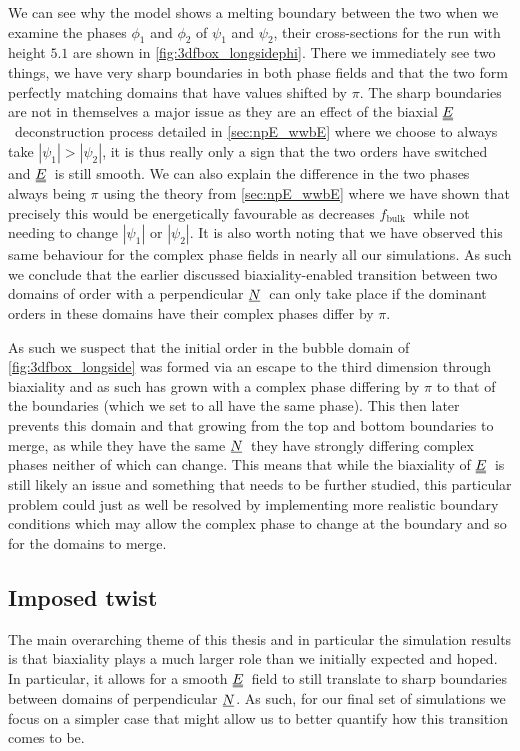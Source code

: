 \documentclass[12pt]{article}
\newcommand{\suf}[2]{\stackunder[0.5pt]{\stackunder[1pt]{\ensuremath{#1}}{\rule{\widthof{\ensuremath{#2}}*\real{0.9}}{.1ex}}}{}}
\newcommand{\duf}[2]{\stackunder[0.5pt]{\stackunder[0.8pt]{\stackunder[1pt]{\ensuremath{#1}}{\rule{\widthof{\ensuremath{#2}}*\real{0.9}}{.1ex}}}{\rule{\widthof{\ensuremath{#2}}*\real{0.9}}{.1ex}}}{}}
\newcommand{\su}[1]{\suf{#1}{#1}}
\newcommand{\du}[1]{\duf{#1}{#1}}
\newcommand{\NN}{\ensuremath{\su{N}}}
\newcommand{\EE}{\ensuremath{\du{E}}}
\newcommand{\FB}{\ensuremath{f_\text{bulk}}}
\begin{document}
        We can see why the model shows a melting boundary between the two when we examine the phases $\phi_1$ and $\phi_2$ of $\psi_1$ and $\psi_2$, their cross-sections for the run with height $5.1\si{}$ are shown in \cref{fig:3dfbox_longsidephi}.
        There we immediately see two things, we have very sharp boundaries in both phase fields and that the two form perfectly matching domains that have values shifted by $\pi$.
        The sharp boundaries are not in themselves a major issue as they are an effect of the biaxial \EE\ deconstruction process detailed in \cref{sec:npE_wwbE} where we choose to always take $|\psi_1| > |\psi_2|$, it is thus really only a sign that the two orders have switched and \EE\ is still smooth.
        We can also explain the difference in the two phases always being $\pi$ using the theory from \cref{sec:npE_wwbE} where we have shown that precisely this would be energetically favourable as decreases \FB\ while not needing to change $|\psi_1|$ or $|\psi_2|$.
        It is also worth noting that we have observed this same behaviour for the complex phase fields in nearly all our simulations.
        As such we conclude that the earlier discussed biaxiality-enabled transition between two domains of order with a perpendicular \NN\ can only take place if the dominant orders in these domains have their complex phases differ by $\pi$.

        As such we suspect that the initial order in the bubble domain of \cref{fig:3dfbox_longside} was formed via an escape to the third dimension through biaxiality and as such has grown with a complex phase differing by $\pi$ to that of the boundaries (which we set to all have the same phase).
        This then later prevents this domain and that growing from the top and bottom boundaries to merge, as while they have the same \NN\ they have strongly differing complex phases neither of which can change.
        This means that while the biaxiality of \EE\ is still likely an issue and something that needs to be further studied, this particular problem could just as well be resolved by implementing more realistic boundary conditions which may allow the complex phase to change at the boundary and so for the domains to merge.

    \subsection{Imposed twist}\label{sec:nr_it}
        The main overarching theme of this thesis and in particular the simulation results is that biaxiality plays a much larger role than we initially expected and hoped.
        In particular, it allows for a smooth \EE\ field to still translate to sharp boundaries between domains of perpendicular \NN.
        As such, for our final set of simulations we focus on a simpler case that might allow us to better quantify how this transition comes to be.
\end{document}
